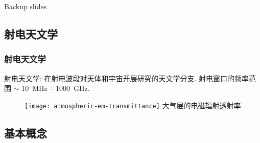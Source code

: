 \documentclass{beamer}
\begin{document}
\appendix

\begin{frame}[standout]
  Backup slides
\end{frame}

\subsection{射电天文学}

\begin{frame}[subsec]
  \frametitle{射电天文学}
  \alert{射电天文学}:
  在射电波段对天体和宇宙开展研究的天文学分支.
  \alert{射电窗口}的频率范围 $\sim$ \SI{10}{\MHz} -- \SI{1000}{\GHz}.

  \begin{figure}
    \centering\footnotesize
    \texttt{[image: atmospheric-em-transmittance]}
    大气层的电磁辐射透射率
  \end{figure}

  \vspace*{0.5em}
\end{frame}

\subsection{基本概念}
\end{document}
